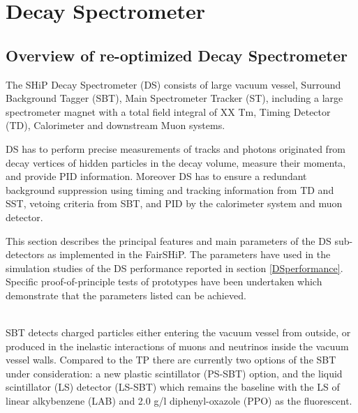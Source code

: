\section{Decay Spectrometer}
\label{DecaySpectrometer}
\subsection{Overview of re-optimized Decay Spectrometer}

The SHiP Decay Spectrometer (DS) consists of large vacuum vessel, Surround Background Tagger (SBT), Main Spectrometer Tracker (ST), including a large spectrometer magnet with a total field integral of XX Tm, Timing Detector (TD), Calorimeter and downstream Muon systems.

DS has to perform precise measurements of tracks and photons originated from decay vertices of hidden particles in the decay volume, measure their momenta, and provide PID information. Moreover DS has to ensure a redundant background suppression using timing and tracking information from TD and SST, vetoing criteria from SBT, and PID by the calorimeter system and muon detector. 

This section describes the principal features and main parameters of the DS sub-detectors as implemented in the FairSHiP. The parameters have used in the simulation studies of the DS performance reported in section \ref{DSperformance}. Specific proof-of-principle tests of prototypes have been undertaken which demonstrate that the parameters listed can be achieved.

\\
\noindent
SBT detects charged particles either entering the vacuum vessel from outside, or produced in the inelastic interactions of muons and neutrinos inside the vacuum vessel walls. Compared to the TP there are currently two options of the SBT under consideration: a new plastic scintillator (PS-SBT) option, and the liquid scintillator (LS) detector (LS-SBT) which remains the baseline with the LS of linear alkybenzene (LAB) and 2.0 g/l diphenyl-oxazole (PPO) as the fluorescent.

